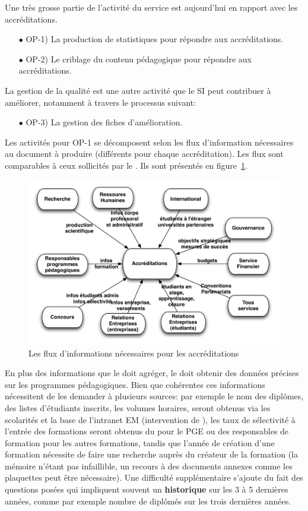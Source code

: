 \documentclass{book}
\begin{document}
Une très grosse partie de l'activité  du service est aujourd'hui en rapport avec
les accréditations.
\begin{itemize}
\item[$\bullet$]  OP-1)   La  production  de  statistiques   pour  répondre  aux
  accréditations.
\item[$\bullet$]  OP-2) Le  criblage du  contenu pédagogique  pour répondre  aux
  accréditations.
\end{itemize}
La gestion de la qualité est une autre activité que le SI peut contribuer à
améliorer, notamment à travers le processus suivant:
\begin{itemize}
\item[$\bullet$] OP-3) La gestion des fiches d'amélioration.
\end{itemize}
\bigskip
Les activités pour OP-1 se  décomposent selon les flux d'information nécessaires
au document  à produire (différents  pour chaque accréditation).  Les  flux sont
comparables   à  ceux   sollicités  par   le  \scom.   Ils  sont   présentés  en
figure~\ref{fg:accred_flux}.
\begin{figure}[hbt]
\begin{center}
\includegraphics[width=.75\linewidth]{figs/accred_flux.pdf}
\end{center}
\caption{Les flux d'informations nécessaires pour les accréditations}
\label{fg:accred_flux}
\end{figure}
En plus  des informations que  le \scom doit agréger,  le \sop doit  obtenir des
données  précises  sur les  programmes  pédagogiques.  Bien que  cohérentes  ces
informations nécessitent de les demander à plusieurs sources: par exemple le nom
des  diplômes, des  listes d'étudiants  inscrits, les  volumes horaires,  seront
obtenus via  les scolarités et la  base de l'intranet EM  (intervention de \CK),
les taux de sélectivité à l'entrée  des formations seront obtenus du \sconc pour
le PGE ou  des responsables de formation pour les  autres formations, tandis que
l'année de création  d'une formation nécessite de faire une  recherche auprès du
créateur de la  formation (la mémoire n'étant pas infaillible,  un recours à des
documents annexes  comme les plaquettes  peut être nécessaire).   Une difficulté
supplémentaire s'ajoute du  fait des questions posées qui  impliquent souvent un
\textbf{historique} sur les 3 à 5  dernières années, comme par exemple nombre de
diplômés sur les trois dernières années.
\end{document}
